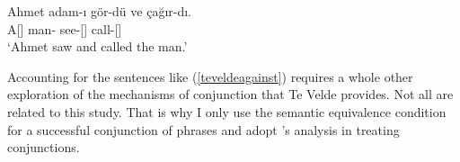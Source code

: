 \begin{exe}
    \ex \label{teveldeagainst} 
    \gll Ahmet adam-ı gör-dü ve çağır-dı. \\ 
    A[{\Nom}] man-{\Acc} see-{\Pst}[{\Tsg}] {\And} call-{\Pst}[{\Tsg}] \\
    \glt `Ahmet saw and called the man.'
\end{exe}

Accounting for the sentences like (\ref{teveldeagainst}) requires a whole other exploration of the mechanisms of conjunction that Te Velde provides. Not all are related to this study. That is why I only use the semantic equivalence condition for a successful conjunction of phrases and adopt \cite{munn1993topics}'s analysis in treating conjunctions.